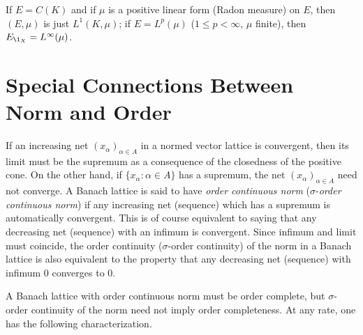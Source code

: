 If\/ $ E = C(K) $ and if\/ $ \mu $ is a positive linear form (Radon measure) on $ E $, then $ (E,\mu) $ is just $ L^{1}(K,\mu) $;
if\/ $ E = L^{p}(\mu) $ ($ 1 \leq p < \infty $, $ \mu $ finite), then $ E_{\1_{X}} = L^{\infty}(\mu) $.
\section{Special Connections Between Norm and Order}\label{sec:c1-5}%
If an increasing net $ (x_{\alpha})_{\alpha\in A} $ in a normed vector lattice is convergent, then its limit must be the supremum as a consequence of the closedness of the positive cone.
On the other hand, if\/ $ \{x_{\alpha} \colon \alpha \in A\} $ has a supremum, the net $ (x_{\alpha})_{\alpha\in A} $ need not converge.
A Banach lattice is said to have \emph{order continuous norm} ($ \sigma $-\emph{order continuous norm}) if any increasing net (sequence) which has a supremum is automatically convergent.
This is of course equivalent to saying that any decreasing net (sequence) with an infimum is convergent.
Since infimum and limit must coincide, the order continuity ($ \sigma $-order continuity) of the norm in a Banach lattice is also equivalent to the property that any decreasing net (sequence) with infimum $ 0 $ converges to $ 0 $.

A Banach lattice with order continuous norm must be order complete, but $ \sigma $-order continuity of the norm need not imply order completeness.
At any rate, one has the following characterization.

